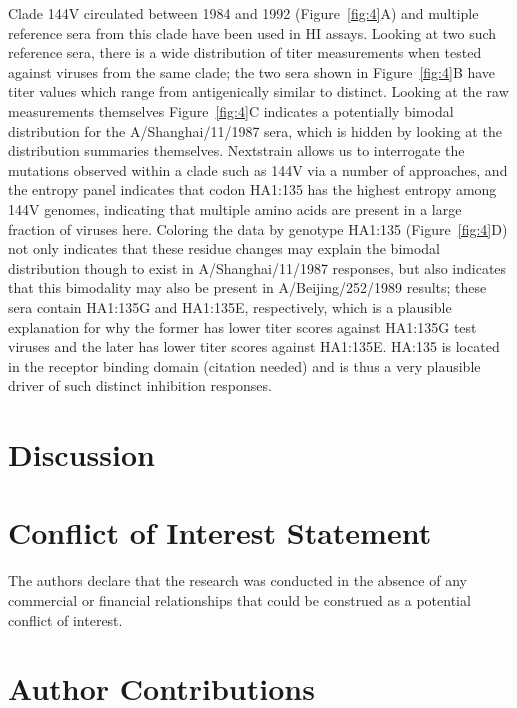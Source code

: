 \documentclass[utf8]{FrontiersinHarvard} %
\begin{document}
Clade 144V circulated between 1984 and 1992 (Figure~\ref{fig:4}A) and multiple reference sera from this clade have been used in HI assays.
Looking at two such reference sera, there is a wide distribution of titer measurements when tested against viruses from the same clade; the two sera shown in Figure~\ref{fig:4}B have titer values which range from antigenically similar to distinct.
Looking at the raw measurements themselves Figure~\ref{fig:4}C indicates a potentially bimodal distribution for the A/Shanghai/11/1987 sera, which is hidden by looking at the distribution summaries themselves.
Nextstrain allows us to interrogate the mutations observed within a clade such as 144V via a number of approaches, and the entropy panel indicates that codon HA1:135 has the highest entropy among 144V genomes, indicating that multiple amino acids are present in a large fraction of viruses here. 
Coloring the data by genotype HA1:135 (Figure~\ref{fig:4}D) not only indicates that these residue changes may explain the bimodal distribution though to exist in A/Shanghai/11/1987 responses, but also indicates that this bimodality may also be present in A/Beijing/252/1989 results; these sera contain HA1:135G and HA1:135E, respectively, which is a plausible explanation for why the former has lower titer scores against HA1:135G test viruses and the later has lower titer scores against HA1:135E.
HA:135 is located in the receptor binding domain (citation needed) and is thus a very plausible driver of such distinct inhibition responses.


\section{Discussion}

\section*{Conflict of Interest Statement}

The authors declare that the research was conducted in the absence of any commercial or financial relationships that could be construed as a potential conflict of interest.

\section*{Author Contributions}
\end{document}
